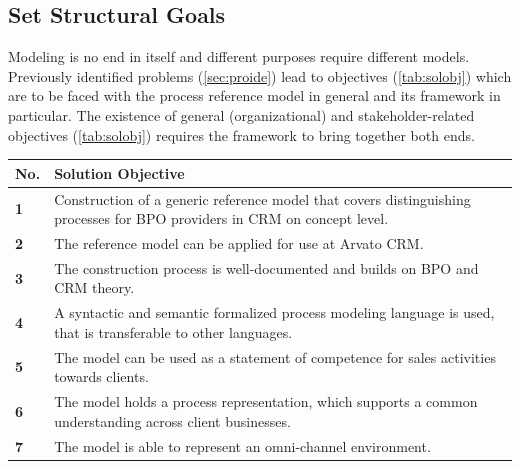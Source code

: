 	\subsection{Set Structural Goals}
	
	Modeling is no end in itself and different purposes require different models. Previously identified problems (\ref{sec:proide}) lead to objectives (\ref{tab:solobj}) which are to be faced with the process reference model in general and its framework in particular. The existence of general (organizational) and stakeholder-related objectives (\cf \Tab \ref{tab:solobj}) requires the framework to bring together both ends.
	
	\begin{table}[caption={Solution Objectives}, label={tab:solobj}]
		\centering
		\begin{tabular}{l p{13.3cm}}

			\textbf{No. }&\textbf{ Solution Objective}
			 \\ \hline
			\textbf{1 }                        & Construction of a generic reference model that covers distinguishing processes for BPO providers in CRM on concept level.                                                    \\ \hline
			\textbf{2}                         & The reference model can be applied for use at Arvato CRM.                                                                                                                    \\ \hline
			\textbf{3 }                        & The construction process is well-documented and builds on \acrshort{BPO} and \acrshort{CRM} theory.\\ \hline
			\textbf{4}                         & A syntactic and semantic formalized process modeling language is used, that is transferable to other languages.                                                              \\ \hline
			\textbf{5}                         & The model can be used as a statement of competence for sales activities towards clients.                                                                                     \\ \hline
			\textbf{6}                         & The model holds a process representation, which supports a common understanding across client businesses.                                                                    \\ \hline
			\textbf{7}                         & The model is able to represent an omni-channel environment.                                                                                                                 
		\end{tabular}
	\end{table}

